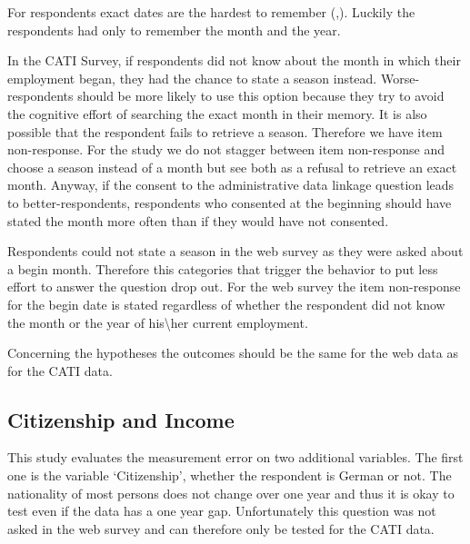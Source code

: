 For respondents exact dates are the hardest to remember (\cite{Wagenaar86},\cite{Friedman93}). Luckily the respondents had only to remember the month and the year.

In the CATI Survey, if respondents did not know about the month in which their employment began, they had the chance to state a season instead. Worse-respondents should be more likely to use this option because they try to avoid the cognitive effort of searching the exact month in their memory. It is also possible that the respondent fails to retrieve a season. Therefore we have item non-response. For the study we do not stagger between item non-response and choose a season instead of a month but see both as a refusal to retrieve an exact month. Anyway, if the consent to the administrative data linkage question leads to better-respondents, respondents who consented at the beginning should have stated the month more often than if they would have not consented.

Respondents could not state a season in the web survey as they were asked about a begin month. Therefore this categories that trigger the behavior to put less effort to answer the question drop out. For the web survey the item non-response for the begin date is stated regardless of whether the respondent did not know the month or the year of his\textbackslash her current employment.

Concerning the hypotheses the outcomes should be the same for the web data as for the CATI data.


\subsection{Citizenship and Income}

This study evaluates the measurement error on two additional variables. The first one is the variable `Citizenship', whether the respondent is German or not. The nationality of most persons does not change over one year and thus it is okay to test even if the data has a one year gap. Unfortunately this question was not asked in the web survey and can therefore only be tested for the CATI data.

